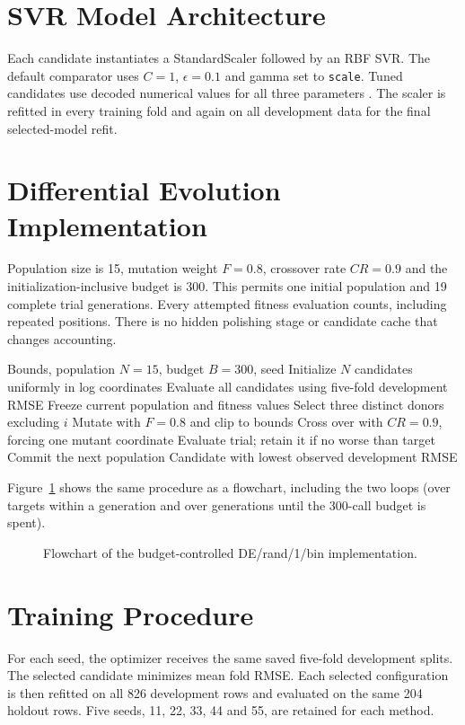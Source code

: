 \section{SVR Model Architecture}
Each candidate instantiates a StandardScaler followed by an RBF SVR. The default comparator uses $C=1$, $\epsilon=0.1$ and gamma set to \texttt{scale}. Tuned candidates use decoded numerical values for all three parameters \cite{svr}. The scaler is refitted in every training fold and again on all development data for the final selected-model refit.
\section{Differential Evolution Implementation}
Population size is 15, mutation weight $F=0.8$, crossover rate $CR=0.9$ and the initialization-inclusive budget is 300. This permits one initial population and 19 complete trial generations. Every attempted fitness evaluation counts, including repeated positions. There is no hidden polishing stage or candidate cache that changes accounting.

\begin{algorithm}[htbp]\caption{Budget-controlled DE/rand/1/bin}\begin{algorithmic}[1]
\Require Bounds, population $N=15$, budget $B=300$, seed
\State Initialize $N$ candidates uniformly in log coordinates
\State Evaluate all candidates using five-fold development RMSE
\State Freeze current population and fitness values
\State Select three distinct donors excluding $i$
\State Mutate with $F=0.8$ and clip to bounds
\State Cross over with $CR=0.9$, forcing one mutant coordinate
\State Evaluate trial; retain it if no worse than target
\EndFor
\State Commit the next population
\EndFor
\State \Return Candidate with lowest observed development RMSE
\end{algorithmic}\end{algorithm}
Figure~\ref{fig:deflow} shows the same procedure as a flowchart, including the two loops (over targets within a generation and over generations until the 300-call budget is spent).
\begin{figure}[htbp]\centering\resizebox{!}{0.6\textheight}{}\caption{Flowchart of the budget-controlled DE/rand/1/bin implementation.}\label{fig:deflow}\end{figure}
\section{Training Procedure}
For each seed, the optimizer receives the same saved five-fold development splits. The selected candidate minimizes mean fold RMSE. Each selected configuration is then refitted on all 826 development rows and evaluated on the same 204 holdout rows. Five seeds, 11, 22, 33, 44 and 55, are retained for each method.


